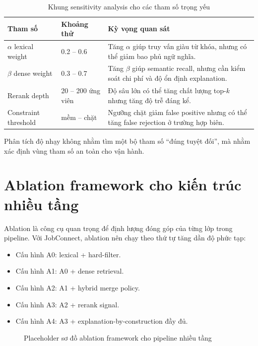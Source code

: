 \begin{table}[H]
\caption{Khung sensitivity analysis cho các tham số trọng yếu}
\centering
\begin{tabularx}{\textwidth}{p{}p{}X}
\toprule
\textbf{Tham số} & \textbf{Khoảng thử} & \textbf{Kỳ vọng quan sát}\\
\midrule
$\alpha$ lexical weight & 0.2 -- 0.6 & Tăng $\alpha$ giúp truy vấn giàu từ khóa, nhưng có thể giảm bao phủ ngữ nghĩa.\\
$\beta$ dense weight & 0.3 -- 0.7 & Tăng $\beta$ giúp semantic recall, nhưng cần kiểm soát chi phí và độ ổn định explanation.\\
Rerank depth & 20 -- 200 ứng viên & Độ sâu lớn có thể tăng chất lượng top-$k$ nhưng tăng độ trễ đáng kể.\\
Constraint threshold & mềm -- chặt & Ngưỡng chặt giảm false positive nhưng có thể tăng false rejection ở trường hợp biên.\\
\bottomrule
\end{tabularx}
\end{table}

Phân tích độ nhạy không nhằm tìm một bộ tham số ``đúng tuyệt đối'', mà nhằm xác định vùng tham số an toàn cho vận hành.

\section{Ablation framework cho kiến trúc nhiều tầng}

Ablation là công cụ quan trọng để định lượng đóng góp của từng lớp trong pipeline. Với JobConnect, ablation nên chạy theo thứ tự tăng dần độ phức tạp:

\begin{itemize}
  \item Cấu hình A0: lexical + hard-filter.
  \item Cấu hình A1: A0 + dense retrieval.
  \item Cấu hình A2: A1 + hybrid merge policy.
  \item Cấu hình A3: A2 + rerank signal.
  \item Cấu hình A4: A3 + explanation-by-construction đầy đủ.
\end{itemize}

\begin{figure}[H]
\centering
{}
\caption{Placeholder sơ đồ ablation framework cho pipeline nhiều tầng}
\label{fig:ablation-framework-placeholder}
\end{figure}

